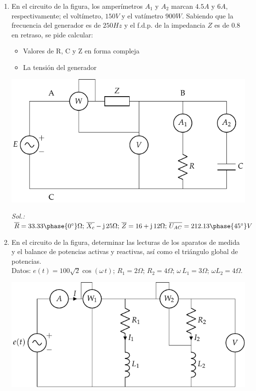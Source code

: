 \begin{enumerate}
\item En el circuito de la figura, los amperímetros $A_1$ y $A_2$
  marcan ${4.5}{A}$ y ${6}{A}$, respectivamente; el voltímetro,
  ${150}{V}$ y el vatímetro ${900}{W}$. Sabiendo que la frecuencia del
  generador es de ${250}{Hz}$ y el f.d.p. de la impedancia $Z$ es de
  0.8 en retraso, se pide calcular:
  \begin{itemize}
  \item Valores de R, C y Z en forma compleja
  \item La tensión del generador
  \end{itemize}
  \begin{center}
    \includegraphics{../figs/ej9_BT2.pdf}
  \end{center}

  \emph{Sol.:
    $\overline{R}=33.33\phase{0^\circ}\Omega;
    \,\overline{X_c}-\mathrm{j}\,25\Omega;\,\overline{Z}=16+\mathrm{j}\,12\Omega;\,\overline{U_{AC}}=212.13\phase{45^\circ}
    V$}

\item En el circuito de la figura, determinar las lecturas de los aparatos de medida y el balance de potencias activas y reactivas, así como el triángulo global de potencias.\\
Datos: $e(t)=100\sqrt{2}\cos(\omega\,t)$; $R_1=2\Omega$;
$R_2=4\Omega$; $\omega\,L_1=3\Omega$; $\omega L_2=4\Omega$.

  \begin{center}
    \includegraphics{../figs/ej11_BT2.pdf}
  \end{center}
    

\end{enumerate}
